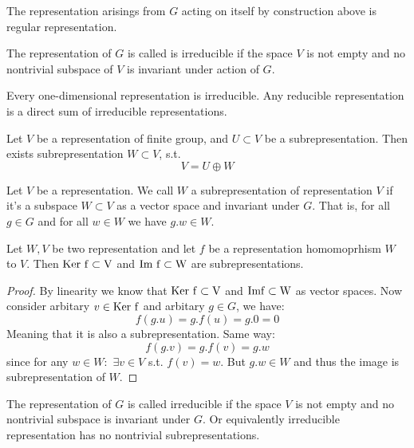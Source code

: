 \documentclass{amsart}
\def\ker{\rm Ker\ }
\def\im{\rm Im}
\begin{document}
\begin{definition}
The representation arisings from $G$ acting on itself by construction above is regular representation.
\end{definition}

\begin{definition}

The representation of $G$ is called is irreducible if the space $V$ is not empty and no nontrivial subspace of $V$ is invariant under action of $G$.
    
\end{definition}

\begin{lemma}
    Every one-dimensional representation is irreducible. Any reducible representation is a direct sum of irreducible representations.
\end{lemma}

\begin{theorem}
    Let $V$ be a representation of finite group, and $U \subset V$ be a subrepresentation. Then exists subrepresentation $W\subset V$, s.t.
    $$ V = U \oplus W$$
\end{theorem}


    \begin{definition}
        Let $V$ be a representation. We call $W$ a subrepresentation of representation $V$ if it's a subspace $W\subset V$ as a vector space and invariant under $G$. That is, for all $g \in G$ and for all $w \in W$ we have $g.w \in W$.
    \end{definition}

    \begin{lemma}
        Let $W, V$ be two representation and let $f$ be a representation homomoprhism $W$ to $V$. Then $\ker f \subset V$ and $\im \ f \subset W$ are subrepresentations.
    \end{lemma}

    \begin{proof}
        By linearity we know that $\ker f \subset V$ and $\im f \subset W$ as vector spaces. Now consider arbitary $v \in \ker f$ and arbitary $g \in G$, we have:
        $$ f(g.u) = g . f(u) = g . 0 = 0$$
        Meaning that it is also a subrepresentation. Same way:
        $$ f(g.v) = g. f(v) = g.w$$
        since for any $w \in W:$ $\exists v \in V$ s.t. $f(v)=w$. But $g.w \in W$ and thus the image is subrepresentation of $W$.
    \end{proof}

    \begin{definition}
        The representation of $G$ is called irreducible if the space $V$ is not empty and no nontrivial subspace is invariant under $G$. Or equivalently irreducible representation has no nontrivial subrepresentations.
    \end{definition}
\end{document}
